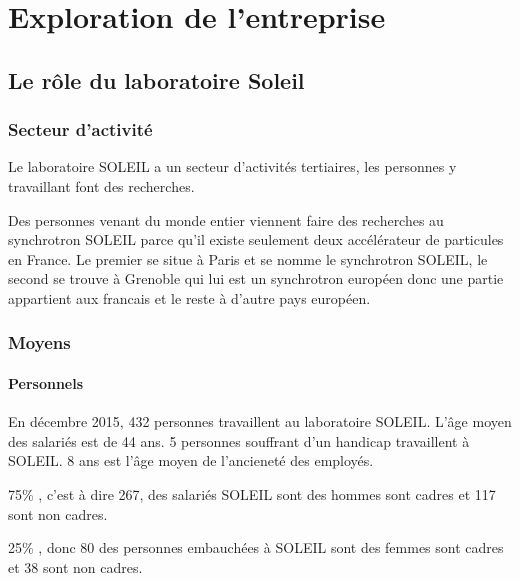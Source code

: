 \chapter{Exploration de l'entreprise}
	\minitoc






\section{Le rôle du laboratoire Soleil}

	\subsection{Secteur d'activité}
				Le laboratoire SOLEIL a un secteur d'activités tertiaires, les personnes y travaillant font des recherches. 
				
				Des personnes venant du monde entier viennent faire des recherches au synchrotron SOLEIL parce qu'il existe seulement deux accélérateur de particules en France. Le premier se situe à Paris et se nomme le synchrotron SOLEIL, le second se trouve à Grenoble qui lui est un synchrotron européen donc une partie appartient aux francais et le reste à d'autre pays européen.
	\subsection{Moyens}
		
		\subsubsection{Personnels}
				En décembre 2015, 432 personnes travaillent au laboratoire SOLEIL. L'âge moyen des salariés est de 44 ans. 5 personnes souffrant d'un handicap travaillent à SOLEIL. 8 ans est l'âge moyen de l'ancieneté des employés.
				
				75\% , c'est à dire 267, des salariés SOLEIL sont des hommes sont cadres et 117 sont non cadres.
				
				25\% , donc 80 des personnes embauchées à SOLEIL sont des femmes sont cadres et 38 sont non cadres.


